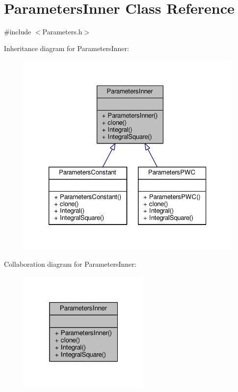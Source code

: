 \hypertarget{classParametersInner}{}\section{Parameters\+Inner Class Reference}
\label{classParametersInner}


{\ttfamily \#include $<$Parameters.\+h$>$}



Inheritance diagram for Parameters\+Inner\+:
\nopagebreak
\begin{figure}[H]
\begin{center}
\leavevmode
\includegraphics[width=326pt]{classParametersInner__inherit__graph}
\end{center}
\end{figure}


Collaboration diagram for Parameters\+Inner\+:
\nopagebreak
\begin{figure}[H]
\begin{center}
\leavevmode
\includegraphics[width=184pt]{classParametersInner__coll__graph}
\end{center}
\end{figure}
